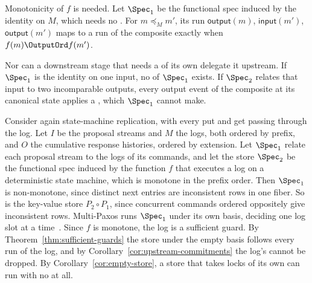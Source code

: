 Monotonicity of $f$ is needed.  Let $\Spec_1$ be the functional spec induced
by the identity on $M$, which needs no \commitment.  For $m\preceq_M m'$, its
run $\mathsf{output}(m)$, $\mathsf{input}(m')$, $\mathsf{output}(m')$ maps to
a run of the composite exactly when $f(m)\OutputOrd f(m')$.

Nor can a downstream stage that needs a \commitment of its own delegate it
upstream.  If $\Spec_1$ is the identity on one input, no \commitment of
$\Spec_1$ exists.  If $\Spec_2$ relates that input to two incomparable
outputs, every output event of the composite at its canonical state applies a
\commitment, which $\Spec_1$ cannot make.

\begin{example}
\label{ex:committed-log-composition}
Consider again state-machine replication, with every put and get passing
through the log.  Let $I$ be the proposal streams and $M$ the logs, both
ordered by prefix, and $O$ the cumulative response histories, ordered by
extension.  Let $\Spec_1$ relate each proposal stream to the logs of its
commands, and let the store $\Spec_2$ be the functional spec induced by the
function $f$ that executes a log on a deterministic state machine, which is
monotone in the prefix order.  Then $\Spec_1$ is non-monotone, since distinct next entries are inconsistent rows in one fiber.  So is the key-value store
$P_2\circ P_1$, since concurrent commands ordered oppositely give inconsistent rows.  Multi-Paxos runs $\Spec_1$ under its own basis, deciding one log
slot at a time~\cite{schneider1990smr,lamport2001paxos}.  Since $f$ is
monotone, the log is a sufficient guard.  By Theorem~\ref{thm:sufficient-guards} the store under the empty basis follows every run of the log, and by Corollary~\ref{cor:upstream-commitments} the log's \commitments cannot be
dropped.  By Corollary~\ref{cor:empty-store}, a store that takes locks of its
own can run with no \commitments at all.
\end{example}

